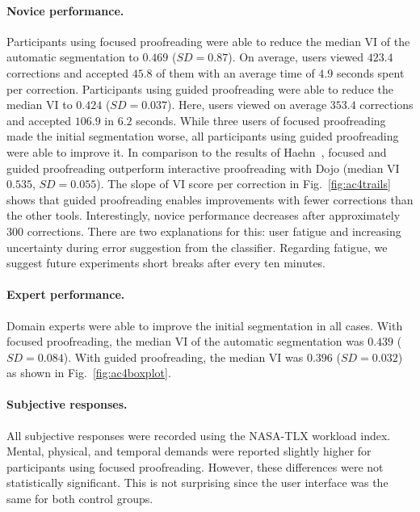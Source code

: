 \paragraph{Novice performance.} Participants using focused proofreading were able to reduce the median VI of the automatic segmentation to $0.469$ ($SD=0.87$). On average, users viewed $423.4$ corrections and accepted $45.8$ of them with an average time of $4.9$ seconds spent per correction. Participants using guided proofreading were able to reduce the median VI to $0.424$ ($SD=0.037$). Here, users viewed on average $353.4$ corrections and accepted $106.9$ in $6.2$ seconds. While three users of focused proofreading made the initial segmentation worse, all participants using guided proofreading were able to improve it. In comparison to the results of Haehn~\etal, focused and guided proofreading outperform interactive proofreading with Dojo (median VI $0.535$, $SD=0.055$). The slope of VI score per correction in Fig.~\ref{fig:ac4trails} shows that guided proofreading enables improvements with fewer corrections than the other tools. Interestingly, novice performance decreases after approximately $300$ corrections. There are two explanations for this: user fatigue and increasing uncertainty during error suggestion from the classifier. Regarding fatigue, we suggest future experiments short breaks after every ten minutes.

\paragraph{Expert performance.} Domain experts were able to improve the initial segmentation in all cases. With focused proofreading, the median VI of the automatic segmentation was $0.439$ ($SD=0.084$). With guided proofreading, the median VI was $0.396$ ($SD=0.032$) as shown in Fig.~\ref{fig:ac4boxplot}.

\paragraph{Subjective responses.} All subjective responses were recorded using the NASA-TLX workload index. Mental, physical, and temporal demands were reported slightly higher for participants using focused proofreading. However, these differences were not statistically significant. This is not surprising since the user interface was the same for both control groups.

